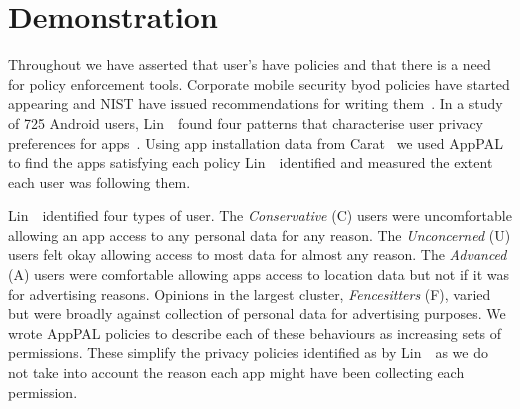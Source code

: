 \documentclass[]{llncs}
\begin{document}
\section{Demonstration}
\label{sec:demonstation}

Throughout we have asserted that user's have policies and that there is a need for policy enforcement tools.
Corporate mobile security \ac{byod} policies have started appearing and NIST have issued recommendations for writing them~\cite{Scarfone:2009vy,Souppaya:2013jf}.
In a study of 725 Android users, Lin~\etal~found four patterns that characterise user privacy preferences for apps~\cite{Sadeh:2014vq}.
Using app installation data from Carat~\cite{Oliner:2013ht} we used AppPAL to find the apps satisfying each policy Lin~\etal~identified and measured the extent each user was following them.

Lin~\etal~identified four types of user.
The \emph{Conservative} (C) users were uncomfortable allowing an app access to any personal data for any reason.
The \emph{Unconcerned} (U) users felt okay allowing access to most data for almost any reason.
The \emph{Advanced} (A) users were comfortable allowing apps access to location data but not if it was for advertising reasons.
Opinions in the largest cluster, \emph{Fencesitters} (F), varied but were broadly against collection of personal data for advertising purposes.
We wrote AppPAL policies to describe each of these behaviours as increasing sets of permissions.
These simplify the privacy policies identified as by Lin~\etal~as we do not take into account the reason each app might have been collecting each permission.
\end{document}
